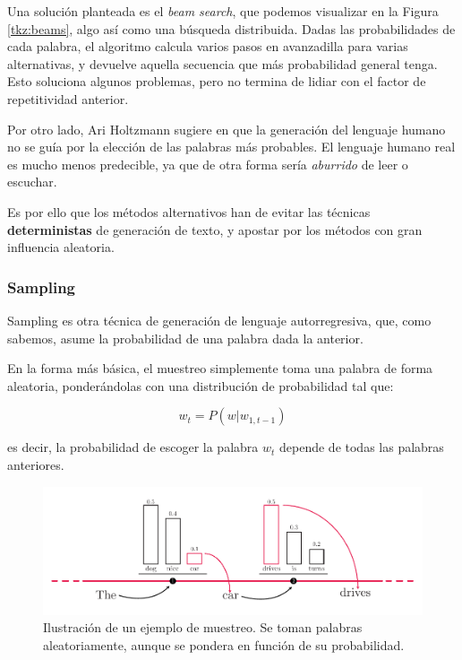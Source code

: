 Una solución planteada es el \textit{beam search}, que podemos visualizar en la Figura \ref{tkz:beams}, algo así como una búsqueda distribuida. Dadas las probabilidades de cada palabra, el algoritmo calcula varios pasos en avanzadilla para varias alternativas, y devuelve aquella secuencia que más probabilidad general tenga. Esto soluciona algunos problemas, pero no termina de lidiar con el factor de repetitividad anterior. 

Por otro lado, Ari Holtzmann sugiere en \cite{holtzman2020curious} que la generación del lenguaje humano no se guía por la elección de las palabras más probables. El lenguaje humano real es mucho menos predecible, ya que de otra forma sería \textit{aburrido} de leer o escuchar.

Es por ello que los métodos alternativos han de evitar las técnicas \textbf{deterministas} de generación de texto, y apostar por los métodos con gran influencia aleatoria.

\subsubsection{Sampling}

Sampling es otra técnica de generación de lenguaje autorregresiva, que, como sabemos, asume la probabilidad de una palabra dada la anterior.

En la forma más básica, el muestreo simplemente toma una palabra de forma aleatoria, ponderándolas con una distribución de probabilidad tal que:

\begin{equation}
	w_t = P(w | w_{1, t-1})
\end{equation}

es decir, la probabilidad de escoger la palabra $w_t$ depende de todas las palabras anteriores.

\begin{figure}[h]
	\centering
	\includegraphics[width=.9\textwidth]{media/sampling.pdf}
	\caption{Ilustración de un ejemplo de muestreo. Se toman palabras aleatoriamente, aunque se pondera en función de su probabilidad.}
	\label{fig:sampling}
\end{figure}


